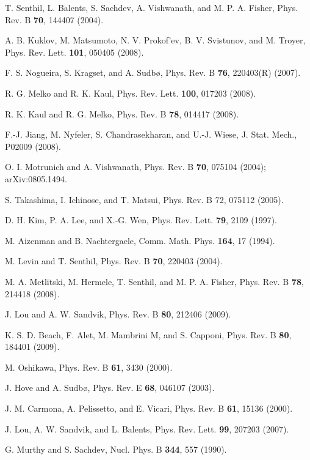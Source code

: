 \documentclass[draft,numberedheadings]{aipproc}
\begin{document}
\begin{thebibliography}{999}
T. Senthil, L. Balents, S. Sachdev, A. Vishwanath, and M. P. A. Fisher,
Phys. Rev. B {\bf 70}, 144407 (2004). 

A. B. Kuklov, M. Matsumoto, N. V. Prokof'ev, B. V. Svistunov, and M. Troyer, Phys. Rev. Lett. {\bf 101}, 050405 (2008).

F. S. Nogueira, S. Kragset, and A. Sudb{\o}, Phys. Rev. B {\bf 76}, 220403(R) (2007).

R. G. Melko and R. K. Kaul, Phys. Rev. Lett. {\bf 100}, 017203 (2008).

R. K. Kaul and R. G. Melko, Phys. Rev. B {\bf 78}, 014417 (2008).

F.-J. Jiang, M. Nyfeler, S. Chandrasekharan, and U.-J. Wiese, J. Stat. Mech., P02009 (2008).

O. I. Motrunich and A. Vishwanath, Phys. Rev. B {\bf 70}, 075104 (2004); arXiv:0805.1494.

S. Takashima, I. Ichinose, and T. Matsui, Phys. Rev. B 72, 075112 (2005).

D. H. Kim, P. A. Lee, and X.-G. Wen, Phys. Rev. Lett. {\bf 79}, 2109 (1997).

M. Aizenman and B. Nachtergaele, Comm. Math. Phys. {\bf 164}, 17 (1994).

M. Levin and T. Senthil, Phys. Rev. B {\bf 70}, 220403 (2004).

M. A. Metlitski, M. Hermele, T. Senthil, and M. P. A. Fisher, Phys. Rev. B {\bf 78}, 214418 (2008).  

J. Lou and A. W. Sandvik, Phys. Rev. B {\bf 80}, 212406 (2009).

K. S. D. Beach, F. Alet,  M. Mambrini M, and S. Capponi, Phys. Rev. B {\bf 80}, 184401 (2009).

M. Oshikawa, Phys. Rev. B {\bf 61}, 3430 (2000).

J. Hove and A. Sudb{\o}, Phys. Rev. E {\bf 68}, 046107 (2003).

J. M. Carmona, A. Pelissetto, and E. Vicari, Phys. Rev. B {\bf 61}, 15136 (2000).

J. Lou, A. W. Sandvik, and L. Balents, Phys. Rev. Lett. {\bf 99}, 207203 (2007).

G. Murthy and S. Sachdev, Nucl. Phys. B {\bf 344}, 557 (1990).


\end{thebibliography}
\end{document}
